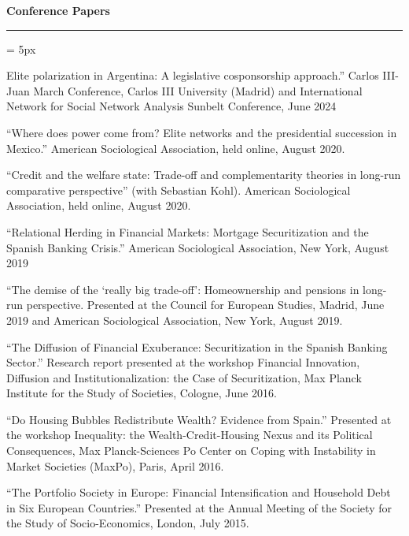 \documentclass[12pt,letterpaper]{article}
\renewcommand{\labelitemi}{$$}
\newcommand{\sectionhead}[1]{\begin{flushleft}\large\bf{#1}\vspace{.1cm}\hrule\end{flushleft}}
\begin{document}

\sectionhead{Conference Papers}
\begin{list}{\labelitemi}{\leftmargin = 5px}
	
\item Elite polarization in Argentina: A legislative cosponsorship approach.''  Carlos III-Juan March Conference, Carlos III University (Madrid) and International Network for Social Network Analysis Sunbelt Conference, June 2024	
	
\item ``Where does power come from?  Elite networks and the presidential succession in Mexico.''  American Sociological Association, held online, August 2020.

\item ``Credit and the welfare state: Trade-off and complementarity theories in long-run comparative perspective'' (with Sebastian Kohl).  American Sociological Association, held online, August 2020.

\item ``Relational Herding in Financial Markets: Mortgage Securitization and the Spanish Banking Crisis.''  American Sociological Association, New York, August 2019

\item ``The demise of the `really big trade-off': Homeownership and pensions in long-run perspective.  Presented at the Council for European Studies, Madrid, June 2019 and American Sociological Association, New York, August 2019.

\item``The Diffusion of Financial Exuberance: Securitization in the Spanish Banking Sector.''  Research report presented at the workshop Financial Innovation, Diffusion and Institutionalization: the Case of Securitization, Max Planck Institute for the Study of Societies, Cologne, June 2016.

\item``Do Housing Bubbles Redistribute Wealth? Evidence from Spain.''  Presented at the workshop Inequality: the Wealth-Credit-Housing Nexus and its Political Consequences, Max Planck-Sciences Po Center on Coping with Instability in Market Societies (MaxPo), Paris, April 2016.

\item``The Portfolio Society in Europe: Financial Intensification and Household Debt in Six European Countries.'' Presented at the Annual Meeting of the Society for the Study of Socio-Economics, London, July 2015.


\end{list}
\end{document}
